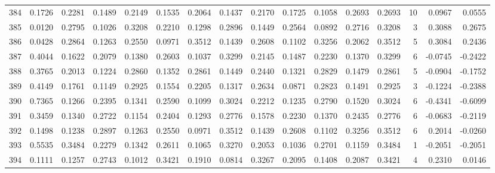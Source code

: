 \begin{tabular}{lrrrrrrrrrrrrrrr}
384 &      0.1726 &  0.2281 &  0.1489 &  0.2149 &  0.1535 &  0.2064 &  0.1437 &  0.2170 &  0.1725 &  0.1058 &   0.2693 &     0.2693 &     10 &                    0.0967 &                     0.0555 \\
385 &      0.0120 &  0.2795 &  0.1026 &  0.3208 &  0.2210 &  0.1298 &  0.2896 &  0.1449 &  0.2564 &  0.0892 &   0.2716 &     0.3208 &      3 &                    0.3088 &                     0.2675 \\
386 &      0.0428 &  0.2864 &  0.1263 &  0.2550 &  0.0971 &  0.3512 &  0.1439 &  0.2608 &  0.1102 &  0.3256 &   0.2062 &     0.3512 &      5 &                    0.3084 &                     0.2436 \\
387 &      0.4044 &  0.1622 &  0.2079 &  0.1380 &  0.2603 &  0.1037 &  0.3299 &  0.2145 &  0.1487 &  0.2230 &   0.1370 &     0.3299 &      6 &                   -0.0745 &                    -0.2422 \\
388 &      0.3765 &  0.2013 &  0.1224 &  0.2860 &  0.1352 &  0.2861 &  0.1449 &  0.2440 &  0.1321 &  0.2829 &   0.1479 &     0.2861 &      5 &                   -0.0904 &                    -0.1752 \\
389 &      0.4149 &  0.1761 &  0.1149 &  0.2925 &  0.1554 &  0.2205 &  0.1317 &  0.2634 &  0.0871 &  0.2823 &   0.1491 &     0.2925 &      3 &                   -0.1224 &                    -0.2388 \\
390 &      0.7365 &  0.1266 &  0.2395 &  0.1341 &  0.2590 &  0.1099 &  0.3024 &  0.2212 &  0.1235 &  0.2790 &   0.1520 &     0.3024 &      6 &                   -0.4341 &                    -0.6099 \\
391 &      0.3459 &  0.1340 &  0.2722 &  0.1154 &  0.2404 &  0.1293 &  0.2776 &  0.1578 &  0.2230 &  0.1370 &   0.2435 &     0.2776 &      6 &                   -0.0683 &                    -0.2119 \\
392 &      0.1498 &  0.1238 &  0.2897 &  0.1263 &  0.2550 &  0.0971 &  0.3512 &  0.1439 &  0.2608 &  0.1102 &   0.3256 &     0.3512 &      6 &                    0.2014 &                    -0.0260 \\
393 &      0.5535 &  0.3484 &  0.2279 &  0.1342 &  0.2611 &  0.1065 &  0.3270 &  0.2053 &  0.1036 &  0.2701 &   0.1159 &     0.3484 &      1 &                   -0.2051 &                    -0.2051 \\
394 &      0.1111 &  0.1257 &  0.2743 &  0.1012 &  0.3421 &  0.1910 &  0.0814 &  0.3267 &  0.2095 &  0.1408 &   0.2087 &     0.3421 &      4 &                    0.2310 &                     0.0146 \\

\end{tabular}
